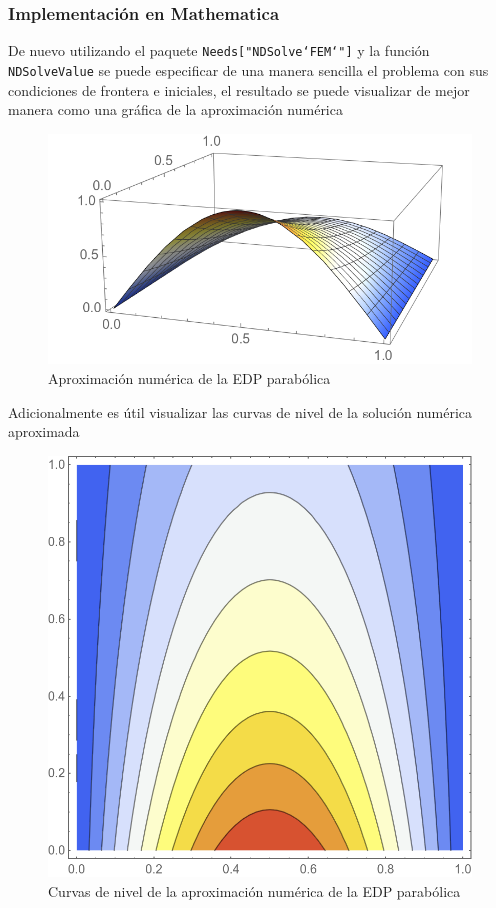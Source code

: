 \documentclass[a4paper]{article}
\begin{document}
\subsubsection{Implementación en Mathematica}
De nuevo utilizando el paquete \texttt{Needs["NDSolve`FEM`"]} y la función \texttt{NDSolveValue} se puede especificar de una manera sencilla el problema con sus condiciones de frontera e iniciales, el resultado se puede visualizar de mejor manera como una gráfica de la aproximación numérica 
\begin{figure}[H]
\begin{center}
\includegraphics[scale=0.42]{./parabolic.png} 
\end{center} 
\caption{Aproximación numérica de la EDP parabólica}
\label{fig::fig5}
\end{figure}
Adicionalmente es útil visualizar las curvas de nivel de la solución numérica aproximada
\begin{figure}[H]
\begin{center}
\includegraphics[scale=0.29]{./parabolic_contour.png} 
\end{center} 
\caption{Curvas de nivel de la aproximación numérica de la EDP parabólica}
\label{fig::fig5}
\end{figure}
\end{document}
